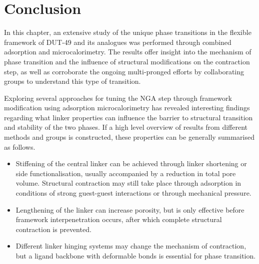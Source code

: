 
\section{Conclusion}

In this chapter, an extensive study of the unique phase transitions
in the flexible framework of DUT-49 and its analogues was performed
through combined adsorption and microcalorimetry.
The results offer insight into the mechanism of phase transition
and the influence of structural modifications on the contraction step,
as well as corroborate the ongoing multi-pronged efforts 
by collaborating groups to understand this type of transition.

Exploring several approaches for tuning the NGA step through
framework modification using adsorption microcalorimetry has revealed
interesting findings regarding what linker properties can
influence the barrier to structural transition and stability of the
two phases. If a high level overview of results from different methods
and groups is constructed, these properties can be generally summarised
as follows.

\begin{itemize}
    \item Stiffening of the central linker can be achieved through 
    linker shortening or side functionalisation, usually accompanied 
    by a reduction in total pore volume. Structural contraction may 
    still take place through adsorption in conditions of strong 
    guest-guest interactions or through mechanical pressure.
    \item Lengthening of the linker can increase porosity,
    but is only effective before framework interpenetration 
    occurs, after which complete structural contraction is 
    prevented.
    \item Different linker hinging systems may change 
    the mechanism of contraction, but a ligand backbone with 
    deformable bonds is essential for phase transition.
\end{itemize}

